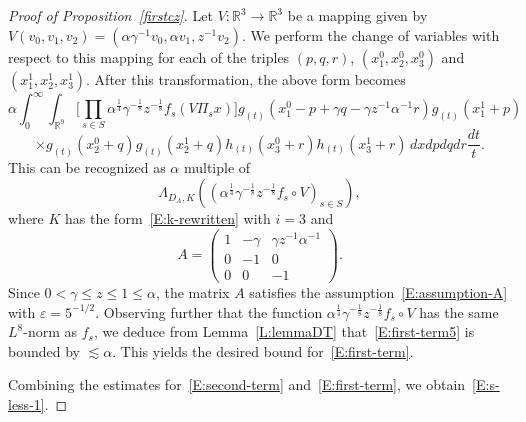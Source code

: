 \documentclass[12pt,reqno]{amsart}
\theoremstyle{plain}
\theoremstyle{definition}
\numberwithin{equation}{section}
\newcommand{\R}{{\mathbb R}}
\begin{document}
\begin{proof}[Proof of Proposition~\ref{firstcz}]
Let $V: \R^3 \rightarrow \R^3$ be a mapping given by $V(v_0,v_1,v_2) = (\alpha \gamma^{-1}v_0, \alpha v_1,z^{-1}v_2)$. We perform the change of variables with respect to this mapping for each of the triples $(p,q,r)$, $(x_1^{0},x_2^{0},x_3^{0})$ and $(x_1^{1},x_2^{1},x_3^{1})$. After this transformation, the above form becomes
\begin{equation}\label{E:first-term5}
\alpha \int_{0}^\infty \int_{\R^9} \Big[\prod_{s\in S} \alpha^{\frac{1}{4}} \gamma^{-\frac{1}{8}} z^{-\frac{1}{8}} f_{s}(V \Pi_s x) \Big] 
g_{(t)}(x_1^0-p+\gamma q-\gamma z^{-1} \alpha^{-1}r) g_{(t)}(x_1^1+p) 
\end{equation}
\begin{equation*}
\times g_{(t)}(x_2^0+q)
g_{(t)}(x_2^1+q) h_{(t)}(x_3^0+r) h_{(t)}(x_3^1+r)\,
dx dp dq dr \frac{dt}{t}.
\end{equation*}
This can be recognized as $\alpha$ multiple of
\[
\Lambda_{D_A,K}(( \alpha^{\frac{1}{4}} \gamma^{-\frac{1}{8}} z^{-\frac{1}{8}} f_{s} \circ V)_{s\in S}),
\]
where $K$ has the form~\eqref{E:k-rewritten} with $i=3$ and 
$$
A=
\left ( \begin{array}{ccc}
1 & -\gamma & \gamma z^{-1} \alpha^{-1}\\
0 & -1 & 0 \\
0 & 0 & -1
\end{array} \right ).
$$
Since $0<\gamma \leq z \leq 1 \leq \alpha$, the matrix $A$ satisfies the assumption~\eqref{E:assumption-A} with $\varepsilon=5^{-1/2}$. 
 Observing further that the function $\alpha^{\frac{1}{4}} \gamma^{-\frac{1}{8}} z^{-\frac{1}{8}} f_{s} \circ V$ has the same $L^8$-norm as $f_{s}$, we deduce from Lemma~\ref{L:lemmaDT} that~\eqref{E:first-term5} is bounded by $\lesssim \alpha$.
This yields the desired bound for~\eqref{E:first-term}.

Combining the estimates for~\eqref{E:second-term} and~\eqref{E:first-term}, we obtain~\eqref{E:s-less-1}.
 







\end{proof}
\end{document}
